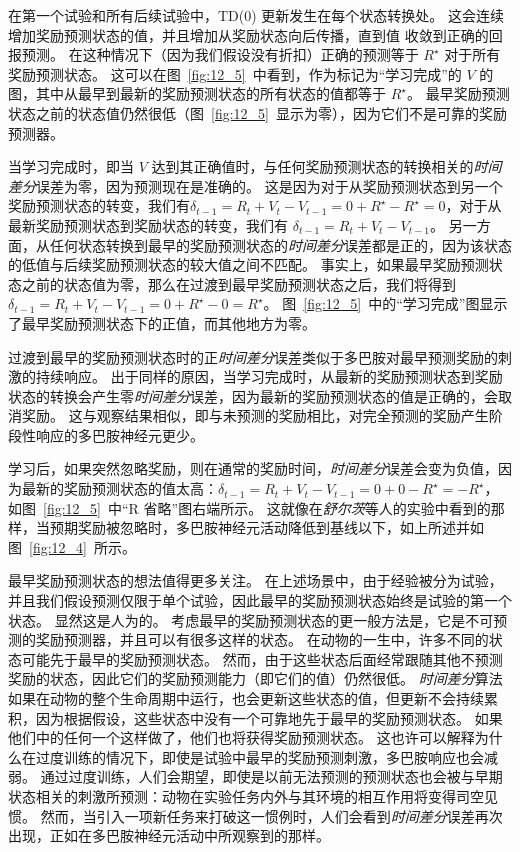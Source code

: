 在第一个试验和所有后续试验中，TD(0) 更新发生在每个状态转换处。
这会连续增加奖励预测状态的值，并且增加从奖励状态向后传播，直到值 收敛到正确的回报预测。
在这种情况下（因为我们假设没有折扣）正确的预测等于 $R^{\star}$ 对于所有奖励预测状态。
这可以在图~\ref{fig:12_5}~中看到，作为标记为“学习完成”的 $V$ 的图，其中从最早到最新的奖励预测状态的所有状态的值都等于 $R^\star$。
最早奖励预测状态之前的状态值仍然很低（图~\ref{fig:12_5}~显示为零），因为它们不是可靠的奖励预测器。


当学习完成时，即当 $V$ 达到其正确值时，与任何奖励预测状态的转换相关的\textit{时间差分}误差为零，因为预测现在是准确的。
这是因为对于从奖励预测状态到另一个奖励预测状态的转变，我们有$\delta_{t-1} = R_t + V_t - V_{t-1} = 0 + R^{\star} - R^{\star} = 0$，对于从最新奖励预测状态到奖励状态的转变，我们有 $\delta_{t-1} = R_t + V_t - V_{t-1}$。
另一方面，从任何状态转换到最早的奖励预测状态的\textit{时间差分}误差都是正的，因为该状态的低值与后续奖励预测状态的较大值之间不匹配。
事实上，如果最早奖励预测状态之前的状态值为零，那么在过渡到最早奖励预测状态之后，我们将得到 $\delta_{t-1} = R_t + V_t - V_{t-1} = 0 + R^{\star} - 0 = R^{\star}$。 
图~\ref{fig:12_5}~中的“学习完成”图显示了最早奖励预测状态下的正值，而其他地方为零。


过渡到最早的奖励预测状态时的正\textit{时间差分}误差类似于多巴胺对最早预测奖励的刺激的持续响应。
出于同样的原因，当学习完成时，从最新的奖励预测状态到奖励状态的转换会产生零\textit{时间差分}误差，因为最新的奖励预测状态的值是正确的，会取消奖励。
这与观察结果相似，即与未预测的奖励相比，对完全预测的奖励产生阶段性响应的多巴胺神经元更少。


学习后，如果突然忽略奖励，则在通常的奖励时间，\textit{时间差分}误差会变为负值，因为最新的奖励预测状态的值太高：$\delta_{t-1} = R_t + V_t - V_{t-1} = 0 + 0 - R^{\star} = -R^{\star}$，如图~\ref{fig:12_5}~中“R 省略”图右端所示。
这就像在\textit{舒尔茨}等人的实验中看到的那样\cite{schultz1993responses}，当预期奖励被忽略时，多巴胺神经元活动降低到基线以下，如上所述并如图~\ref{fig:12_4}~所示。


最早奖励预测状态的想法值得更多关注。
在上述场景中，由于经验被分为试验，并且我们假设预测仅限于单个试验，因此最早的奖励预测状态始终是试验的第一个状态。
显然这是人为的。
考虑最早的奖励预测状态的更一般方法是，它是不可预测的奖励预测器，并且可以有很多这样的状态。
在动物的一生中，许多不同的状态可能先于最早的奖励预测状态。
然而，由于这些状态后面经常跟随其他不预测奖励的状态，因此它们的奖励预测能力（即它们的值）仍然很低。
\textit{时间差分}算法如果在动物的整个生命周期中运行，也会更新这些状态的值，但更新不会持续累积，因为根据假设，这些状态中没有一个可靠地先于最早的奖励预测状态。
如果他们中的任何一个这样做了，他们也将获得奖励预测状态。
这也许可以解释为什么在过度训练的情况下，即使是试验中最早的奖励预测刺激，多巴胺响应也会减弱。
通过过度训练，人们会期望，即使是以前无法预测的预测状态也会被与早期状态相关的刺激所预测：动物在实验任务内外与其环境的相互作用将变得司空见惯。
然而，当引入一项新任务来打破这一惯例时，人们会看到\textit{时间差分}误差再次出现，正如在多巴胺神经元活动中所观察到的那样。



